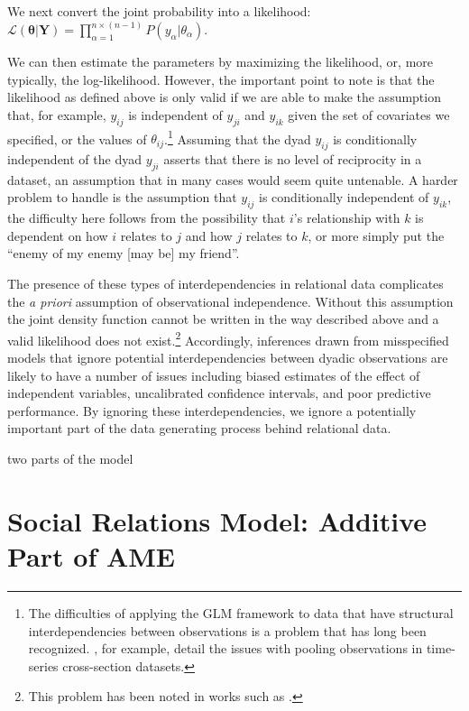 \documentclass[12pt,pdflatex]{elsarticle}
\begin{document}
\noindent We next convert the joint probability into a likelihood: $\displaystyle \mathcal{L} (\bm{\theta} | \mathbf{Y}) = \prod_{\alpha=1}^{n \times (n-1)} P(y_{\alpha} | \theta_{\alpha})$.

We can then estimate the parameters by maximizing the likelihood, or, more typically, the log-likelihood. However, the important point to note is that the likelihood as defined above is only valid if we are able to make the assumption that, for example, $y_{ij}$ is independent of $y_{ji}$ and $y_{ik}$ given the set of covariates we specified, or the values of $\theta_{ij}$.\footnote{The difficulties of applying the GLM framework to data that have structural interdependencies between observations is a problem that has long been recognized. \citet{beck:katz:1995}, for example, detail the issues with pooling observations in time-series cross-section datasets.} Assuming that the dyad $y_{ij}$ is conditionally independent of the dyad $y_{ji}$ asserts that there is no level of reciprocity in a dataset, an assumption that in many cases would seem quite untenable. A harder problem to handle is the assumption that $y_{ij}$ is conditionally independent of $y_{ik}$, the difficulty here follows from the possibility that $i$'s relationship with $k$ is dependent on how $i$ relates to $j$ and how $j$ relates to $k$, or more simply put the ``enemy of my enemy [may be] my friend''.

The presence of these types of interdependencies in relational data complicates the \textit{a priori} assumption of observational independence. Without this assumption the joint density function cannot be written in the way described above and  a valid likelihood does not exist.\footnote{This problem has been noted in works such as \citet{lai:1995,manger:etal:2012,kinne:2013}.} Accordingly, inferences drawn from misspecified models that ignore potential interdependencies between dyadic observations are likely to have a number of issues including biased estimates of the effect of independent variables, uncalibrated confidence intervals, and poor predictive performance. By ignoring these interdependencies, we ignore a potentially important part of the data generating process behind relational data. 

two parts of the model

\section*{\textbf{Social Relations Model: Additive Part of AME}}
\end{document}
